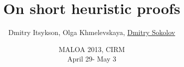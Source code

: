 

\title[\insertframenumber/\inserttotalframenumber~|~
On short heuristic proofs]{On short heuristic proofs}
\author[Sokolov D.O]{Dmitry Itsykson, Olga Khmelevskaya, \underline{Dmitry Sokolov}}

\date{MALOA 2013, CIRM \\
	April 29- May 3}



	\maketitle

	



